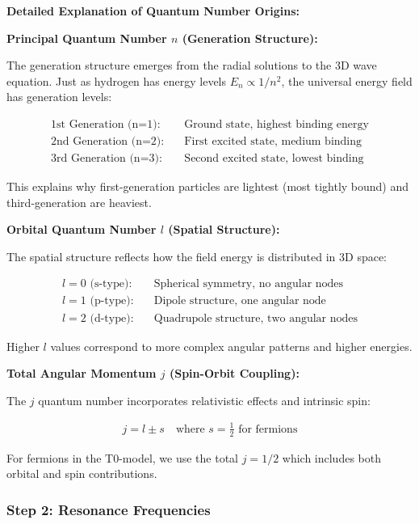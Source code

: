 \documentclass[12pt,a4paper]{article}
\begin{document}
	\textbf{Detailed Explanation of Quantum Number Origins:}
	
	\textbf{Principal Quantum Number $n$ (Generation Structure):}
	
	The generation structure emerges from the radial solutions to the 3D wave equation. Just as hydrogen has energy levels $E_n \propto 1/n^2$, the universal energy field has generation levels:
	
	\begin{align}
		\text{1st Generation (n=1):} \quad &\text{Ground state, highest binding energy} \\
		\text{2nd Generation (n=2):} \quad &\text{First excited state, medium binding} \\
		\text{3rd Generation (n=3):} \quad &\text{Second excited state, lowest binding}
	\end{align}
	
	This explains why first-generation particles are lightest (most tightly bound) and third-generation are heaviest.
	
	\textbf{Orbital Quantum Number $l$ (Spatial Structure):}
	
	The spatial structure reflects how the field energy is distributed in 3D space:
	
	\begin{align}
		l=0 \text{ (s-type):} \quad &\text{Spherical symmetry, no angular nodes} \\
		l=1 \text{ (p-type):} \quad &\text{Dipole structure, one angular node} \\
		l=2 \text{ (d-type):} \quad &\text{Quadrupole structure, two angular nodes}
	\end{align}
	
	Higher $l$ values correspond to more complex angular patterns and higher energies.
	
	\textbf{Total Angular Momentum $j$ (Spin-Orbit Coupling):}
	
	The $j$ quantum number incorporates relativistic effects and intrinsic spin:
	
	\begin{align}
		j = l \pm s \quad \text{where } s = \frac{1}{2} \text{ for fermions}
	\end{align}
	
	For fermions in the T0-model, we use the total $j = 1/2$ which includes both orbital and spin contributions.
	
	\subsubsection{Step 2: Resonance Frequencies}
	\label{subsubsec:step2}
	
\end{document}
